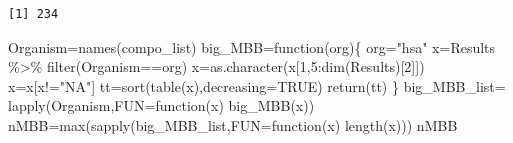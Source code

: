 \documentclass[
  letterpaper,
  DIV=11,
  numbers=noendperiod]{scrreprt}
\newenvironment{Shaded}{}{}
\newcommand{\AttributeTok}[1]{\textcolor[rgb]{0.78,0.47,0.87}{#1}}
\newcommand{\ConstantTok}[1]{\textcolor[rgb]{0.82,0.60,0.40}{#1}}
\newcommand{\ControlFlowTok}[1]{\textcolor[rgb]{0.78,0.47,0.87}{#1}}
\newcommand{\DecValTok}[1]{\textcolor[rgb]{0.82,0.60,0.40}{#1}}
\newcommand{\FunctionTok}[1]{\textcolor[rgb]{0.38,0.69,0.94}{#1}}
\newcommand{\NormalTok}[1]{\textcolor[rgb]{0.67,0.70,0.75}{#1}}
\newcommand{\OtherTok}[1]{\textcolor[rgb]{0.15,0.68,0.38}{#1}}
\newcommand{\SpecialCharTok}[1]{\textcolor[rgb]{0.34,0.71,0.76}{#1}}
\newcommand{\StringTok}[1]{\textcolor[rgb]{0.60,0.76,0.47}{#1}}
\begin{document}
\begin{verbatim}
[1] 234
\end{verbatim}

\begin{Shaded}
\end{Shaded}

\begin{Shaded}
\begin{Highlighting}[]
\NormalTok{Organism}\OtherTok{=}\FunctionTok{names}\NormalTok{(compo\_list)}
\NormalTok{big\_MBB}\OtherTok{=}\ControlFlowTok{function}\NormalTok{(org)\{}
\NormalTok{  org}\OtherTok{=}\StringTok{"hsa"}
\NormalTok{  x}\OtherTok{=}\NormalTok{Results }\SpecialCharTok{\%\textgreater{}\%} \FunctionTok{filter}\NormalTok{(Organism}\SpecialCharTok{==}\NormalTok{org)}
\NormalTok{  x}\OtherTok{=}\FunctionTok{as.character}\NormalTok{(x[}\DecValTok{1}\NormalTok{,}\DecValTok{5}\SpecialCharTok{:}\FunctionTok{dim}\NormalTok{(Results)[}\DecValTok{2}\NormalTok{]])}
\NormalTok{  x}\OtherTok{=}\NormalTok{x[x}\SpecialCharTok{!=}\StringTok{"NA"}\NormalTok{]}
\NormalTok{  tt}\OtherTok{=}\FunctionTok{sort}\NormalTok{(}\FunctionTok{table}\NormalTok{(x),}\AttributeTok{decreasing=}\ConstantTok{TRUE}\NormalTok{)}
  \FunctionTok{return}\NormalTok{(tt)}
\NormalTok{\}}
\NormalTok{big\_MBB\_list}\OtherTok{=} \FunctionTok{lapply}\NormalTok{(Organism,}\AttributeTok{FUN=}\ControlFlowTok{function}\NormalTok{(x) }\FunctionTok{big\_MBB}\NormalTok{(x))}
\NormalTok{nMBB}\OtherTok{=}\FunctionTok{max}\NormalTok{(}\FunctionTok{sapply}\NormalTok{(big\_MBB\_list,}\AttributeTok{FUN=}\ControlFlowTok{function}\NormalTok{(x) }\FunctionTok{length}\NormalTok{(x)))}
\NormalTok{nMBB}
\end{Highlighting}
\end{Shaded}
\end{document}
